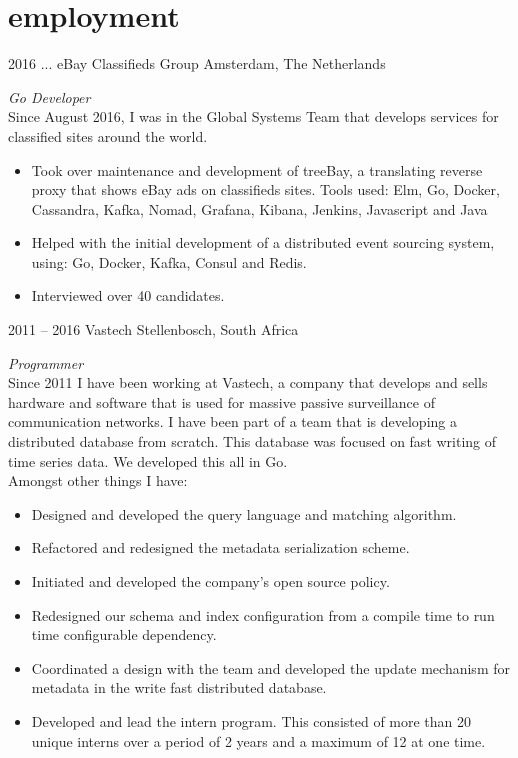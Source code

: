 \documentclass[]{friggeri-cv} %
\begin{document}
\section{employment}
\begin{entrylist}

\entry
{2016 ...}
{eBay Classifieds Group}
{Amsterdam, The Netherlands}
{\emph{Go Developer} \\
Since August 2016, I was in the Global Systems Team that develops services for classified sites around the world.
\begin{itemize}
\item Took over maintenance and development of treeBay, a translating reverse proxy that shows eBay ads on classifieds sites.
      Tools used: Elm, Go, Docker, Cassandra, Kafka, Nomad, Grafana, Kibana, Jenkins, Javascript and Java
\item Helped with the initial development of a distributed event sourcing system, using: Go, Docker, Kafka, Consul and Redis.
\item Interviewed over 40 candidates.
\end{itemize}
}

\entry
{2011 -- 2016}
{Vastech}
{Stellenbosch, South Africa}
{\emph{Programmer} \\
Since 2011 I have been working at Vastech, a company that develops and sells hardware and software that is used for massive passive surveillance of communication networks. I have been part of a team that is developing a distributed database from scratch. This database was focused on fast writing of time series data.  We developed this all in Go. \\
Amongst other things I have: \\
\begin{itemize}
\item Designed and developed the query language and matching algorithm.
\item Refactored and redesigned the metadata serialization scheme.
\item Initiated and developed the company's open source policy.
\item Redesigned our schema and index configuration from a compile time to run time configurable dependency.
\item Coordinated a design with the team and developed the update mechanism for metadata in the write fast distributed database.
\item Developed and lead the intern program. This consisted of more than 20 unique interns over a period of 2 years and a maximum of 12 at one time.
\end{itemize}
}


\end{entrylist}
\end{document}
